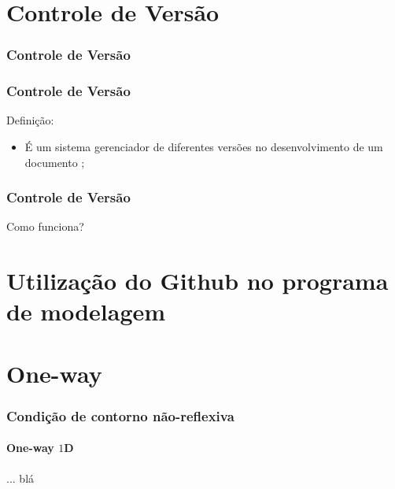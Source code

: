 \documentclass[10pt]{beamer} %
\begin{document}
\section{Controle de Versão}

\begin{frame}
\frametitle{Controle de Versão}
\transboxin

\end{frame}




\begin{frame}
	\frametitle{Controle de Versão}
	\transboxin%
	\begin{block}{Definição:}
		\begin{itemize}
			\pause
			\item É um sistema gerenciador de diferentes versões no desenvolvimento de um documento ;
			\pause %
		\end{itemize}	
	\end{block}
	
\end{frame}


\begin{frame}
	\frametitle{Controle de Versão}
	\transboxin%
	\begin{block}{Como funciona?}
    
	\end{block}
	
\end{frame}


\section{Utilização do Github no programa de modelagem}


\section{One-way}


\begin{frame}
	\frametitle{Condição de contorno não-reflexiva}
	\framesubtitle{One-way $1$D}
	\begin{block}{...}
		blá
	\end{block}		
\end{frame}
\end{document}
